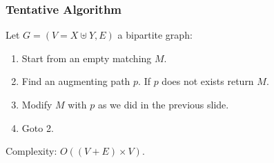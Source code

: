\documentclass{beamer}
\begin{document}
\begin{frame}%
\frametitle{Tentative Algorithm}

Let $G = (V = X \uplus Y, E)$ a bipartite graph:

\vspace{0.2cm}

\begin{enumerate}

\item<2-> Start from an empty matching $M$.

\vspace{0.2cm}

\item<3-> Find an augmenting path $p$. If $p$ does not exists return $M$.

\vspace{0.2cm}

\item<4-> Modify $M$ with $p$ as we did in the previous slide.

\vspace{0.2cm}

\item<5-> Goto 2.

\end{enumerate}

\vspace{0.2cm}

Complexity: $O((V + E)\times V)$.

\end{frame}
\end{document}
